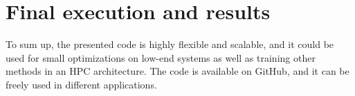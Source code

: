 \documentclass[10pt]{article}
\begin{document}
\section{Final execution and results}
To sum up, the presented code is highly flexible and scalable, and it could be used for small optimizations on low-end systems as well as training other methods in an HPC architecture.
The code is available on GitHub, and it can be freely used in different applications.



\end{document}
